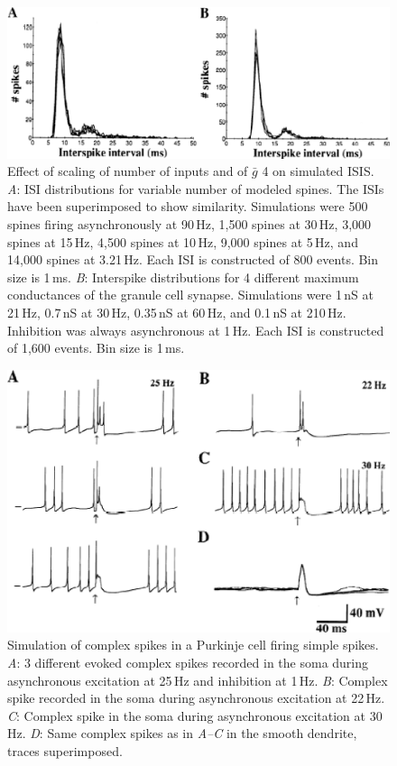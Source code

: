 \documentclass[12pt]{article}
\begin{document}
\clearpage

\begin{figure}[h]
\centering
   \includegraphics[scale=0.75]{figures/Fig.2.10.eps}
   \caption{Effect of scaling of number of inputs and of $\bar g$ 4 on simulated ISIS. {\it A}: ISI distributions for variable number of modeled spines. The ISIs have been superimposed to show similarity. Simulations were 500 spines firing asynchronously at 90\,Hz, 1,500 spines at 30\,Hz, 3,000 spines at 15\,Hz, 4,500 spines at 10\,Hz, 9,000 spines at 5\,Hz, and 14,000 spines at 3.21\,Hz. Each ISI is constructed of 800 events. Bin size is 1\,ms. {\it B}: Interspike distributions for 4 different maximum conductances of the granule cell synapse. Simulations were 1\,nS at 21\,Hz, 0.7\,nS at 30\,Hz, 0.35\,nS at 60\,Hz, and 0.1\,nS at 210\,Hz. Inhibition was always asynchronous at 1\,Hz. Each ISI is constructed of 1,600 events. Bin size is 1\,ms.}
   \label{fig:DS2.10}
\end{figure}

\clearpage

\begin{figure}[h]
\centering
   \includegraphics[scale=0.75]{figures/Fig.2.11.eps}
   \caption {Simulation of complex spikes in a Purkinje cell firing simple spikes. {\it A}: 3 different evoked complex spikes recorded in the soma during asynchronous excitation at 25\,Hz and inhibition at 1\,Hz. {\it B}: Complex spike recorded in the soma during asynchronous excitation at 22\,Hz. {\it C}: Complex spike in the soma during asynchronous excitation at 30\,Hz. {\it D}: Same complex spikes as in {\it A--C} in the smooth dendrite, traces superimposed.}
   \label{fig:DS2.11}
\end{figure}
\end{document}
